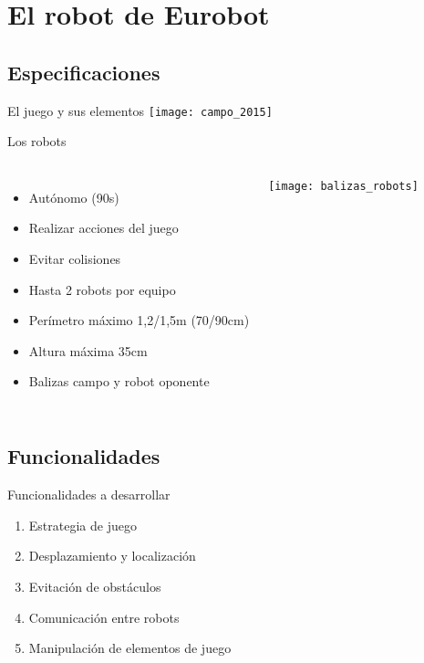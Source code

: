 \documentclass{beamer}
\begin{document}


\section{El robot de Eurobot}
\subsection{Especificaciones}

\begin{frame}{El juego y sus elementos}
\texttt{[image: campo\_2015]}
\end{frame}

\begin{frame}{Los robots}
\begin{columns}

\begin{itemize}
\item Autónomo (90s)
\item Realizar acciones del juego
\item Evitar colisiones
\item Hasta 2 robots por equipo
\item Perímetro máximo 1,2/1,5m (70/90cm)
\item Altura máxima 35cm
\item Balizas campo y robot oponente
\end{itemize}

\centering
\texttt{[image: balizas\_robots]}
\end{columns}
\end{frame}


\subsection{Funcionalidades}

\begin{frame}{Funcionalidades a desarrollar}

\begin{enumerate}
\item<4-> Estrategia de juego
\item<1-> Desplazamiento y localización
\item<2-> Evitación de obstáculos
\item<5-> Comunicación entre robots
\item<3-> Manipulación de elementos de juego
\end{enumerate}

\end{frame}
\end{document}
